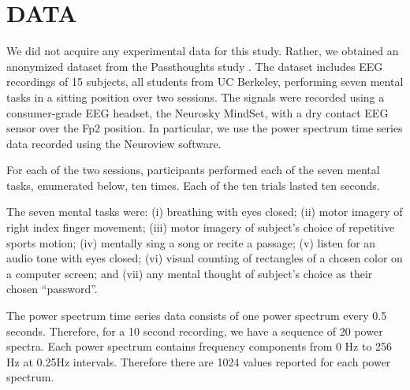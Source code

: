 
\section{\uppercase{Data}}
\label{sec:data}


\noindent We did not acquire any experimental data for this study. Rather, we obtained an anonymized dataset from the Passthoughts study \cite{adams_i_2013}. The dataset includes EEG recordings of 15 subjects, all students from UC Berkeley, performing seven mental tasks in a sitting position over two sessions. The signals were recorded using a consumer-grade EEG headset, the Neurosky MindSet, with a dry contact EEG sensor over the Fp2 position. In particular, we use the power spectrum time series data recorded using the Neuroview software.


For each of the two sessions, participants performed each of the seven mental tasks, enumerated below, ten times. Each of the ten trials lasted ten seconds.

The seven mental tasks were: (i) breathing with eyes closed; (ii) motor imagery of right index finger movement; (iii) motor imagery of subject's choice of repetitive sports motion; (iv) mentally sing a song or recite a passage; (v) listen for an audio tone with eyes closed; (vi) visual counting of rectangles of a chosen color on a computer screen; and (vii) any mental thought of subject's choice as their chosen ``password''.


The power spectrum time series data consists of one power spectrum every 0.5 seconds. Therefore, for a 10 second recording, we have a sequence of 20 power spectra. Each power spectrum contains frequency components from 0 Hz to 256 Hz at 0.25Hz intervals. Therefore there are 1024 values reported for each power spectrum.



